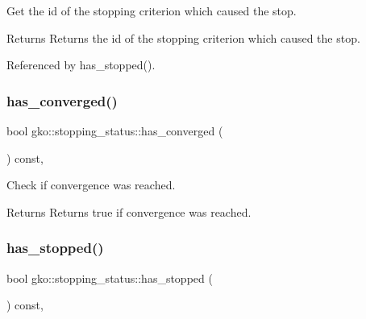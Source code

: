 Get the id of the stopping criterion which caused the stop. 

\begin{DoxyReturn}{Returns}
Returns the id of the stopping criterion which caused the stop. 
\end{DoxyReturn}


Referenced by has\+\_\+stopped().

\mbox{\label{classgko_1_1stopping__status_a825e74142fdaf17e9570d06db0b378db}} 
\subsubsection{\texorpdfstring{has\+\_\+converged()}{has\_converged()}}
{\footnotesize\ttfamily bool gko\+::stopping\+\_\+status\+::has\+\_\+converged (\begin{DoxyParamCaption}{ }\end{DoxyParamCaption}) const\hspace{0.3cm}{\ttfamily [inline]}, {\ttfamily [noexcept]}}



Check if convergence was reached. 

\begin{DoxyReturn}{Returns}
Returns true if convergence was reached. 
\end{DoxyReturn}
\mbox{\label{classgko_1_1stopping__status_af374c7164dcf3adb27a15a669714abcc}} 
\subsubsection{\texorpdfstring{has\+\_\+stopped()}{has\_stopped()}}
{\footnotesize\ttfamily bool gko\+::stopping\+\_\+status\+::has\+\_\+stopped (\begin{DoxyParamCaption}{ }\end{DoxyParamCaption}) const\hspace{0.3cm}{\ttfamily [inline]}, {\ttfamily [noexcept]}}



